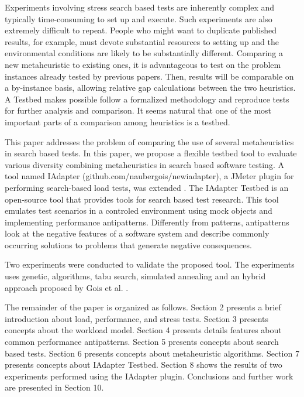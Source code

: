 Experiments involving stress search based tests are inherently complex and typically time-consuming to set up and
execute. Such experiments are also extremely difficult to
repeat. People who might want to duplicate published results, for example, must devote substantial resources to setting up and the environmental conditions are likely to be substantially different. Comparing a new metaheuristic to existing ones, it is advantageous to test on the problem instances already tested by previous papers. Then, results will be comparable on a by-instance basis, allowing relative gap calculations between the two heuristics. A Testbed makes possible follow a formalized methodology and reproduce tests for further analysis and comparison. It seems natural that one of the most important parts of a comparison among heuristics is a testbed\cite{GendreauMichelandPotvin2010}.

This paper addresses the problem of comparing the use of several metaheuristics in search based tests. In this paper, we propose a flexible testbed tool to evaluate various diversity combining metaheuristics in search based software testing. A tool named IAdapter (github.com/naubergois/newiadapter), a JMeter plugin for performing search-based load tests, was extended \cite{Gois2016}. The IAdapter Testbed is an open-source tool that provides  tools for search based test research. This tool emulates test scenarios in a controled environment using mock objects and implementing performance antipatterns. Differently from patterns, antipatterns look at the negative features of a software system and describe commonly occurring solutions to problems that generate negative consequences.

Two experiments were conducted to validate the proposed tool. The experiments uses genetic, algorithms, tabu search, simulated annealing and an hybrid approach proposed by Gois et al. \cite{Gois2016}.

The remainder of the paper is organized as follows. Section 2 presents a brief introduction about load, performance, and stress tests. Section 3 presents concepts about the workload model. Section 4 presents details features about common performance antipatterns. Section 5 presents concepts about search based tests. Section 6 presents concepts about metaheuristic algorithms. Section 7 presents concepts about IAdapter Testbed. Section 8 shows the results of two experiments performed using the IAdapter plugin.  Conclusions and further work are presented in Section 10.
